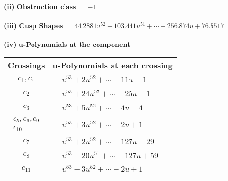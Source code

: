 \documentclass[1p]{elsarticle_modified}
\theoremstyle{definition}
\begin{document}
\flushleft \textbf{(ii) Obstruction class $= -1$}\\~\\
\flushleft \textbf{(iii) Cusp Shapes $= 44.2881 u^{52}-103.441 u^{51}+\cdots+256.874 u+76.5517$}\\~\\
\newpage\renewcommand{\arraystretch}{1}
\flushleft \textbf{(iv) u-Polynomials at the component}\newline \\
\begin{tabular}{m{50pt}|m{274pt}}
Crossings & \hspace{64pt}u-Polynomials at each crossing \\
\hline $$\begin{aligned}c_{1},c_{4}\end{aligned}$$&$\begin{aligned}
&u^{53}+2 u^{52}+\cdots-11 u-1
\end{aligned}$\\
\hline $$\begin{aligned}c_{2}\end{aligned}$$&$\begin{aligned}
&u^{53}+24 u^{52}+\cdots+25 u-1
\end{aligned}$\\
\hline $$\begin{aligned}c_{3}\end{aligned}$$&$\begin{aligned}
&u^{53}+5 u^{52}+\cdots+4 u-4
\end{aligned}$\\
\hline $$\begin{aligned}c_{5},c_{6},c_{9}\\c_{10}\end{aligned}$$&$\begin{aligned}
&u^{53}+3 u^{52}+\cdots-2 u+1
\end{aligned}$\\
\hline $$\begin{aligned}c_{7}\end{aligned}$$&$\begin{aligned}
&u^{53}+2 u^{52}+\cdots-127 u-29
\end{aligned}$\\
\hline $$\begin{aligned}c_{8}\end{aligned}$$&$\begin{aligned}
&u^{53}-20 u^{51}+\cdots+127 u+59
\end{aligned}$\\
\hline $$\begin{aligned}c_{11}\end{aligned}$$&$\begin{aligned}
&u^{53}-3 u^{52}+\cdots-2 u+1
\end{aligned}$\\
\hline
\end{tabular}\\~\\
\end{document}
